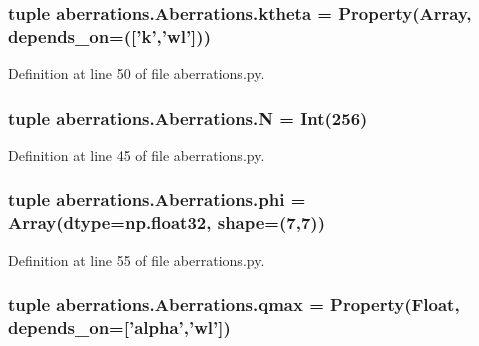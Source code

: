 \hypertarget{classaberrations_1_1_aberrations_aafc218cbf4027b922fd2d681a90acae2}{
\subsubsection[{ktheta}]{\setlength{\rightskip}{0pt plus 5cm}tuple aberrations.\-Aberrations.\-ktheta = Property(Array, depends\-\_\-on=(\mbox{[}'{\bf k}','wl'\mbox{]}))\hspace{0.3cm}{\ttfamily [static]}}}\label{classaberrations_1_1_aberrations_aafc218cbf4027b922fd2d681a90acae2}


Definition at line 50 of file aberrations.\-py.

\hypertarget{classaberrations_1_1_aberrations_a23ac1b59d9bd82141c9e3bc838ede16e}{
\subsubsection[{N}]{\setlength{\rightskip}{0pt plus 5cm}tuple aberrations.\-Aberrations.\-N = Int(256)\hspace{0.3cm}{\ttfamily [static]}}}\label{classaberrations_1_1_aberrations_a23ac1b59d9bd82141c9e3bc838ede16e}


Definition at line 45 of file aberrations.\-py.

\hypertarget{classaberrations_1_1_aberrations_a722d268a33dce0063ce13a839d8cfdac}{
\subsubsection[{phi}]{\setlength{\rightskip}{0pt plus 5cm}tuple aberrations.\-Aberrations.\-phi = Array(dtype=np.\-float32, shape=(7,7))\hspace{0.3cm}{\ttfamily [static]}}}\label{classaberrations_1_1_aberrations_a722d268a33dce0063ce13a839d8cfdac}


Definition at line 55 of file aberrations.\-py.

\hypertarget{classaberrations_1_1_aberrations_ae3e3b86e644ce0a655802264fe091a34}{
\subsubsection[{qmax}]{\setlength{\rightskip}{0pt plus 5cm}tuple aberrations.\-Aberrations.\-qmax = Property(Float, depends\-\_\-on=\mbox{[}'{\bf alpha}','wl'\mbox{]})\hspace{0.3cm}{\ttfamily [static]}}}\label{classaberrations_1_1_aberrations_ae3e3b86e644ce0a655802264fe091a34}


